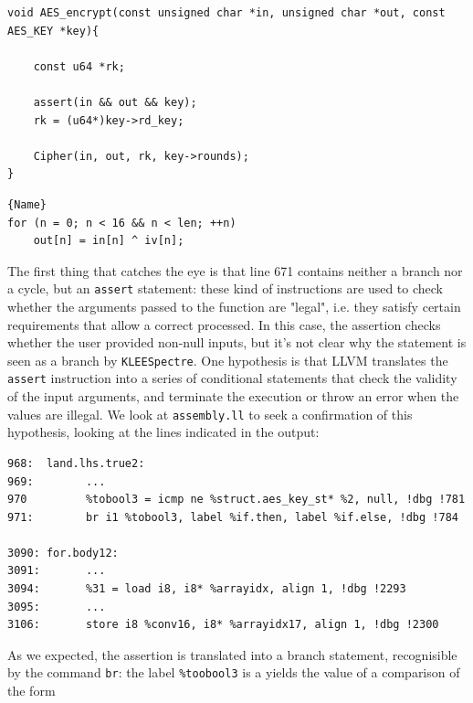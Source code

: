 \documentclass[12pt,a4paper]{book}
\theoremstyle{definition}
\begin{document}
	\begin{minipage}{.9\textwidth}
		\begin{lstlisting}[caption={\texttt{aes\_core.c}}, label=aes-core3, firstnumber=667]
void AES_encrypt(const unsigned char *in, unsigned char *out, const AES_KEY *key){
	
	const u64 *rk;
		
	assert(in && out && key);
	rk = (u64*)key->rd_key;
		
	Cipher(in, out, rk, key->rounds);
}
		\end{lstlisting}
	\end{minipage}
	
	\begin{minipage}{.7\textwidth}
\begin{lstlisting}[caption={\texttt{cbc128.c}}, label=cbc128_3, firstnumber=60]{Name}
for (n = 0; n < 16 && n < len; ++n)
	out[n] = in[n] ^ iv[n];
\end{lstlisting}
	\end{minipage}
	\vspace{3mm}
	
	The first thing that catches the eye is that line 671 contains neither a branch nor a cycle, but an \texttt{assert} statement: these kind of instructions are used to check whether the arguments passed to the function are "legal", i.e. they satisfy certain requirements that allow a correct processed. In this case, the assertion checks whether the user provided non-null inputs, but it's not clear why the statement is seen as a branch by \texttt{KLEESpectre}. One hypothesis is that LLVM translates the \texttt{assert} instruction into a series of conditional statements that check the validity of the input arguments, and terminate the execution or throw an error when the values are illegal. We look at \texttt{assembly.ll} to seek a confirmation of this hypothesis, looking at the lines indicated in the output:
	
	\begin{lstlisting}[caption={\texttt{assembly.ll}}, numbers=none]
968:  land.lhs.true2: 
969:        ...
970			%tobool3 = icmp ne %struct.aes_key_st* %2, null, !dbg !781
971:  		br i1 %tobool3, label %if.then, label %if.else, !dbg !784
		
3090: for.body12:
3091:		...
3094:		%31 = load i8, i8* %arrayidx, align 1, !dbg !2293
3095:		...
3106:		store i8 %conv16, i8* %arrayidx17, align 1, !dbg !2300
	\end{lstlisting}

	As we expected, the assertion is translated into a branch statement, recognisible by the command \texttt{br}: the label \texttt{\%toobool3} is a yields the value of a comparison of the form
	
\end{document}
